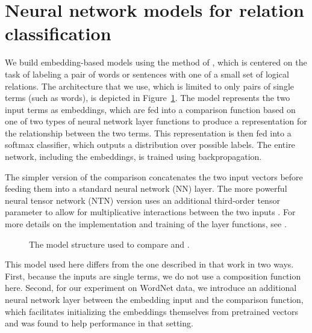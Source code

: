 
\section{Neural network models for relation classification} \label{methods}

We build embedding-based models using the method of
\cite{Bowman:Potts:Manning:2014}, which is centered on the task of
labeling a pair of words or sentences with one of a small set of
logical relations. The architecture that we use, which is limited to
only pairs of single terms (such as words), is depicted in
Figure~\ref{sample-figure}. The model represents the two input terms
as embeddings, which are fed into a comparison function based on one
of two types of neural network layer functions to produce a
representation for the relationship between the two terms. This
representation is then fed into a softmax classifier, which outputs a
distribution over possible labels. The entire network, including the
embeddings, is trained using backpropagation.

The simpler version of the comparison concatenates the two
input vectors before feeding them into a standard neural network (NN)
layer.  The more powerful neural tensor network (NTN) version uses an
additional third-order tensor parameter to allow for multiplicative
interactions between the two inputs \cite{chen2013learning}. For more
details on the implementation and training of the layer functions, see
\cite{Bowman:Potts:Manning:2014}.

\begin{figure}[tp]
  \centering
  
  \caption{The model structure used to compare  and .} 
  \label{sample-figure}
\end{figure}

This model used here differs from the one described in that work in
two ways. First, because the inputs are single terms, we do not use
a composition function here. Second, for our experiment on WordNet data, 
we introduce an additional neural network layer between the embedding 
input and the comparison function, which facilitates initializing the 
embeddings themselves from pretrained vectors and was found to help 
performance in that setting.


